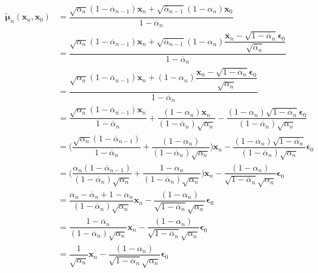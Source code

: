\documentclass[14pt, a4paper]{article}
\numberwithin{equation}{section}
\numberwithin{figure}{section}
\numberwithin{dl}{section}
\numberwithin{md}{section}
\numberwithin{bd}{section}
\numberwithin{dn}{section}
\numberwithin{hq}{section}
\begin{document}
    \begin{equation}
        \begin{aligned}
            \tilde{\boldsymbol{\mu}}_n (\boldsymbol{x}_n, \boldsymbol{x}_0) &= \dfrac{\sqrt{\alpha_n}(1 - \overline{\alpha}_{n-1})\boldsymbol{x}_n + \sqrt{\overline{\alpha}_{n-1}}(1 - \alpha_n) \boldsymbol{x}_0}{1 - \overline{\alpha}_n} \\
            &= \dfrac{\sqrt{\alpha_n}(1 - \overline{\alpha}_{n-1})\boldsymbol{x}_n + \sqrt{\overline{\alpha}_{n-1}}(1 - \alpha_n) \dfrac{\boldsymbol{x}_n - \sqrt{1 - \overline{\alpha}_n} \boldsymbol{\epsilon}_0}{\sqrt{\overline{\alpha}_n}}}{1 - \overline{\alpha}_n} \\
            &= \dfrac{\sqrt{\alpha_n}(1 - \overline{\alpha}_{n-1})\boldsymbol{x}_n + (1 - \alpha_n) \dfrac{\boldsymbol{x}_n - \sqrt{1 - \overline{\alpha}_n} \boldsymbol{\epsilon}_0}{\sqrt{\alpha_n}}}{1 - \overline{\alpha}_n} \\
            &= \dfrac{\sqrt{\alpha_n}(1- \overline{\alpha}_{n-1})\boldsymbol{x}_n}{1 - \overline{\alpha}_n} + \dfrac{(1 - \alpha_n)\boldsymbol{x}_n}{(1 - \overline{\alpha}_n) \sqrt{\alpha_n}} - \dfrac{(1 - \alpha_n) \sqrt{1 - \overline{\alpha}_n} \boldsymbol{\epsilon}_0}{(1 - \overline{\alpha}_n)\sqrt{\alpha_n}} \\
            &= \Bigg( \dfrac{\sqrt{\alpha_n}(1- \overline{\alpha}_{n-1})}{1 - \overline{\alpha}_n} + \dfrac{(1 - \alpha_n)}{(1 - \overline{\alpha}_n) \sqrt{\alpha_n}} \Bigg) \boldsymbol{x}_n - \dfrac{(1 - \alpha_n) \sqrt{1 - \overline{\alpha}_n}}{(1 - \overline{\alpha}_n)\sqrt{\alpha_n}} \boldsymbol{\epsilon}_0 \\
            &= \Bigg( \dfrac{\alpha_n (1 - \overline{\alpha}_{n-1})}{(1 - \overline{\alpha}_n)\sqrt{\alpha_n}} + \dfrac{1 - \alpha_n}{(1 - \overline{\alpha}_n)\sqrt{\alpha_n}} \Bigg) \boldsymbol{x}_n - \dfrac{(1 - \alpha_n)}{\sqrt{1 - \overline{\alpha}_n}\sqrt{\alpha_n}} \boldsymbol{\epsilon}_0 \\
            &= \dfrac{\alpha_n - \overline{\alpha}_n + 1 - \alpha_n}{(1 - \overline{\alpha}_n)\sqrt{\alpha_n}} \boldsymbol{x}_n - \dfrac{(1 - \alpha_n)}{\sqrt{1 - \overline{\alpha}_n}\sqrt{\alpha_n}} \boldsymbol{\epsilon}_0 \\
            &= \dfrac{1 - \overline{\alpha}_n}{(1 - \overline{\alpha}_n)\sqrt{\alpha_n}} \boldsymbol{x}_n - \dfrac{(1 - \alpha_n)}{\sqrt{1 - \overline{\alpha}_n}\sqrt{\alpha_n}} \boldsymbol{\epsilon}_0 \\
            &= \dfrac{1}{\sqrt{\alpha_n}} \boldsymbol{x}_n - \dfrac{(1 - \alpha_n)}{\sqrt{1 - \overline{\alpha}_n}\sqrt{\alpha_n}} \boldsymbol{\epsilon}_0 \\
        \end{aligned}
    \end{equation}
\end{document}
